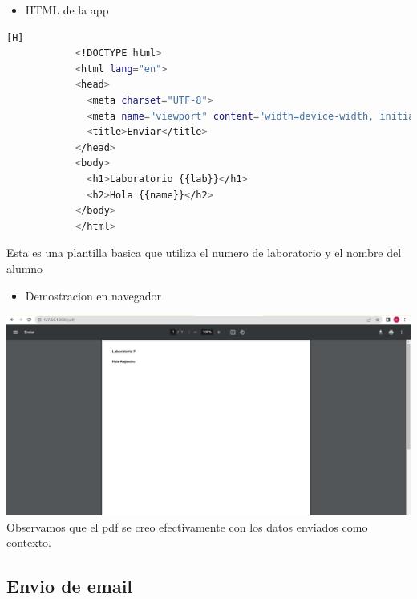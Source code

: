 \documentclass{article}
\begin{document}
         \begin{itemize}
            \item HTML de la app
        \end{itemize}
        \begin{lstlisting}[language=bash,caption={Archivo TemplateToPDF/templates/pdf.html}][H]
            <!DOCTYPE html>
            <html lang="en">
            <head>
              <meta charset="UTF-8">
              <meta name="viewport" content="width=device-width, initial-scale=1.0">
              <title>Enviar</title>
            </head>
            <body>
              <h1>Laboratorio {{lab}}</h1>
              <h2>Hola {{name}}</h2>
            </body>
            </html>
	\end{lstlisting}
        Esta es una plantilla basica que utiliza el numero de laboratorio y el nombre del alumno\newline

        
        \begin{itemize}
            \item Demostracion en navegador\newline
            
        \end{itemize}
        \includegraphics[width=16cm]{img/PDF DEMOSTRACION IMG.png}
        \newline Observamos que el pdf se creo efectivamente con los datos enviados como contexto.
        
        \subsection{Envio de email}
        
\end{document}
